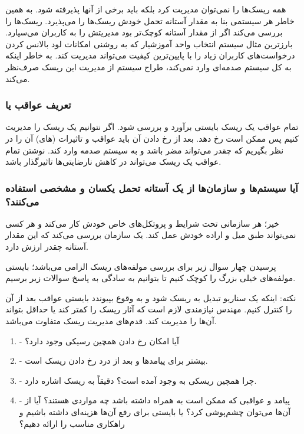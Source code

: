 همه ریسک‌ها را نمی‌توان مدیریت کرد بلکه باید برخی از آنها پذیرفته شود. به همین
خاطر هر سیستمی بنا به مقدار آستانه تحمل خودش ریسک‌ها را می‌پذیرد. ریسک‌ها را
بررسی می‌کند اگر از مقدار آستانه کوچک‌تر بود مدیریتش را به کاربران می‌سپارد.
بارزترین مثال سیستم انتخاب واحد آموزشیار که به روشنی امکانات لود بالانس کردن
درخواست‌های کاربران زیاد را با پایین‌ترین کیفیت می‌تواند مدیریت کند. به خاطر
اینکه به کل سیستم صدمه‌ای وارد نمی‌کند، طراح سیستم از مدیریت این ریسک صرف‌نظر
می‌کند.

\subsubsection{تعریف عواقب یا }

تمام عواقب  یک ریسک بایستی برآورد و بررسی شود. اگر نتوانیم یک
ریسک را مدیریت کنیم پس ممکن است رخ دهد. بعد از رخ دادن آن باید عواقب و تاثیرات
(های) آن را در نظر بگیریم که چقدر می‌تواند مضر باشد و به سیستم
صدمه وارد کند. نوشتن تمام عواقب یک ریسک می‌تواند در کاهش نارضایتی‌ها تاثیرگذار
باشد.

\subsubsection*{آیا سیستم‌ها و سازمان‌ها از یک آستانه تحمل یکسان و مشخصی استفاده
می‌کنند؟}

خیر؛ هر سازمانی تحت شرایط و پروتکل‌های خاص خودش کار می‌کند و هر کسی نمی‌تواند
طبق میل و اراده خودش عمل کند. یک سازمان بررسی می‌کند که این مقدار آستانه چقدر
ارزش دارد.

پرسیدن چهار سوال زیر برای بررسی مولفه‌های ریسک الزامی می‌باشد؛ بایستی مولفه‌های
خیلی بزرگ را کوچک کنیم تا بتوانیم به سادگی به پاسخ سوالات زیر برسیم.

نکته: اینکه یک سناریو تبدیل به ریسک شود و به وقوع بپیوندد بایستی عواقب بعد از آن
را کنترل کنیم. مهندس نیازمندی لازم است که آثار ریسک را کمتر کند یا حداقل بتواند
آن‌ها را مدیریت کند. قدم‌های مدیریت ریسک متفاوت می‌باشد.

\begin{enumerate}
    \item {} - آیا امکان رخ دادن همچین رسیکی وجود دارد؟ 
    \item {} - بیشتر برای پیامد‌ها و بعد از درد رخ دادن ریسک است. 
    \item {} - چرا همچین ریسکی به وجود آمده است؟ دقیقاً به ریسک اشاره
    دارد.
    \item {} - پیامد و عواقبی که ممکن است به
    همراه داشته باشد چه مواردی هستند؟ آیا از آن‌ها می‌توان چشم‌پوشی کرد؟ یا
    بایستی برای رفع آن‌ها هزینه‌ای داشته باشیم و راهکاری مناسب را ارائه دهیم؟
\end{enumerate}

